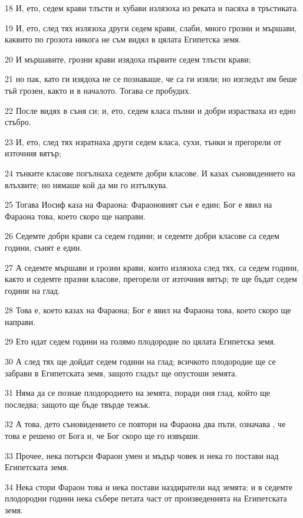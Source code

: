 \par 18 И, ето, седем крави тлъсти и хубави излязоха из реката и пасяха в тръстиката.
\par 19 И, ето, след тях излязоха други седем крави, слаби, много грозни и мършави, каквито по грозота никога не съм видял в цялата Египетска земя.
\par 20 И мършавите, грозни крави изядоха първите седем тлъсти крави;
\par 21 но пак, като ги изядоха не се познаваше, че са ги изяли; но изгледът им беше тъй грозен, както и в началото. Тогава се пробудих.
\par 22 После видях в съня си; и, ето, седем класа пълни и добри израстваха из едно стъбро.
\par 23 И, ето, след тях изратнаха други седем класа, сухи, тънки и прегорели от източния вятър;
\par 24 тънките класове погълнаха седемте добри класове. И казах съновидението на влъхвите; но нямаше кой да ми го изтълкува.
\par 25 Тогава Иосиф каза на Фараона: Фараоновият сън е един; Бог е явил на Фараона това, което скоро ще направи.
\par 26 Седемте добри крави са седем години; и седемте добри класове са седем години, сънят е един.
\par 27 А седемте мършави и грозни крави, които излязоха след тях, са седем години, както и седемте празни класове, прегорели от източния вятър; те ще бъдат седем години на глад.
\par 28 Това е, което казах на Фараона; Бог е явил на Фараона това, което скоро ще направи.
\par 29 Ето идат седем години на голямо плодородие по цялата Египетска земя.
\par 30 А след тях ще дойдат седем години на глад; всичкото плодородие ще се забрави в Египетската земя, защото гладът ще опустоши земята.
\par 31 Няма да се познае плодородието на земята, поради оня глад, който ще последва; защото ще бъде твърде тежък.
\par 32 А това, дето съновидението се повтори на Фараона два пъти, означава , че това е решено от Бога и, че Бог скоро ще го извърши.
\par 33 Прочее, нека потърси Фараон умен и мъдър човек и нека го постави над Египетската земя.
\par 34 Нека стори Фараон това и нека постави наздиратели над земята; и в седемте плодородни години нека събере петата част от произведенията на Египетската земя.

